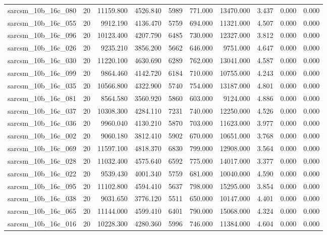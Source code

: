 \begin{tabular}{lrrrrrrrrr}
sarcsm\_10b\_16c\_080 & 20 & 11159.800 & 4526.840 & 5989 & 771.000 & 13470.000 & 3.437 & 0.000 & 0.000 \\
sarcsm\_10b\_16c\_055 & 20 & 9912.190 & 4136.470 & 5759 & 694.000 & 11321.000 & 4.507 & 0.000 & 0.000 \\
sarcsm\_10b\_16c\_096 & 20 & 10123.400 & 4207.790 & 6485 & 730.000 & 12327.000 & 3.812 & 0.000 & 0.000 \\
sarcsm\_10b\_16c\_026 & 20 & 9235.210 & 3856.200 & 5662 & 646.000 & 9751.000 & 4.647 & 0.000 & 0.000 \\
sarcsm\_10b\_16c\_030 & 20 & 11220.100 & 4630.690 & 6289 & 762.000 & 13041.000 & 4.587 & 0.000 & 0.000 \\
sarcsm\_10b\_16c\_099 & 20 & 9864.460 & 4142.720 & 6184 & 710.000 & 10755.000 & 4.243 & 0.000 & 0.000 \\
sarcsm\_10b\_16c\_035 & 20 & 10566.800 & 4322.900 & 5740 & 754.000 & 13187.000 & 4.801 & 0.000 & 0.000 \\
sarcsm\_10b\_16c\_081 & 20 & 8564.580 & 3560.920 & 5860 & 603.000 & 9124.000 & 4.886 & 0.000 & 0.000 \\
sarcsm\_10b\_16c\_037 & 20 & 10308.300 & 4284.110 & 7231 & 740.000 & 12250.000 & 4.526 & 0.000 & 0.000 \\
sarcsm\_10b\_16c\_036 & 20 & 9960.040 & 4130.210 & 5870 & 703.000 & 11623.000 & 3.977 & 0.000 & 0.000 \\
sarcsm\_10b\_16c\_002 & 20 & 9060.180 & 3812.410 & 5902 & 670.000 & 10651.000 & 3.768 & 0.000 & 0.000 \\
sarcsm\_10b\_16c\_069 & 20 & 11597.100 & 4818.370 & 6830 & 799.000 & 12908.000 & 3.564 & 0.000 & 0.000 \\
sarcsm\_10b\_16c\_028 & 20 & 11032.400 & 4575.640 & 6592 & 775.000 & 14017.000 & 3.377 & 0.000 & 0.000 \\
sarcsm\_10b\_16c\_022 & 20 & 9539.430 & 4001.340 & 5759 & 681.000 & 10040.000 & 4.590 & 0.000 & 0.000 \\
sarcsm\_10b\_16c\_095 & 20 & 11102.800 & 4594.410 & 5637 & 798.000 & 15295.000 & 3.854 & 0.000 & 0.000 \\
sarcsm\_10b\_16c\_038 & 20 & 9031.650 & 3776.120 & 5511 & 650.000 & 10147.000 & 4.401 & 0.000 & 0.000 \\
sarcsm\_10b\_16c\_065 & 20 & 11144.000 & 4599.410 & 6401 & 790.000 & 15068.000 & 4.324 & 0.000 & 0.000 \\
sarcsm\_10b\_16c\_016 & 20 & 10228.300 & 4280.360 & 5996 & 746.000 & 11384.000 & 4.604 & 0.000 & 0.000 \\

\end{tabular}
